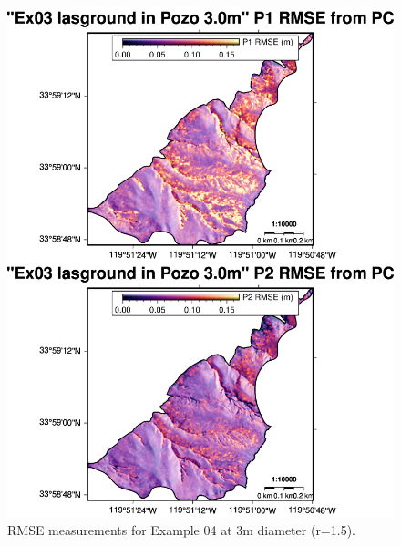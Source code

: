 \documentclass[a4paperpaper,,tablecaptionabove]{scrartcl}
\begin{document}
\begin{figure}
\centering
\includegraphics[width=\textwidth,height=0.9\textheight]{./tex2pdf.-e6884bf2dada0f3b/e3538b59ae9604f2dda37d17f457e1c96f2a1805.png}
\caption{RMSE measurements for Example 04 at 3m diameter
(r=1.5).\label{Fig:Ex04_cl2_3.0m_2panel_RMSE}}
\end{figure}
\end{document}
